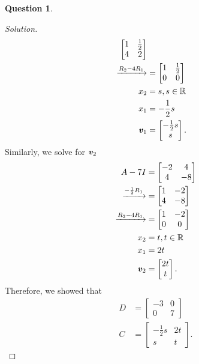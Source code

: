 \documentclass{article}
\newcommand{\R}{\mathbb{R}}
\theoremstyle{definition}
\newtheorem{question}{Question}
\newcommand{\vt}[1]{\textbf{\textit{#1}}}
\newcommand{\0}{\textbf{0}}
\begin{document}
\begin{question}
\begin{proof}[Solution]
\begin{align*}
        \begin{bmatrix}
            1 & \frac{1}{2} \\
            4 & 2
        \end{bmatrix} \\
        \xrightarrow{R_2-4R_1} &=
        \begin{bmatrix}
            1 & \frac{1}{2} \\
            0 & 0
        \end{bmatrix} \\
        x_2 &= s, s\in\R \\
        x_1 &= -\frac{1}{2}s \\
        \vt{v}_1 &=
        \begin{bmatrix}
            -\frac{1}{2}s \\ s
        \end{bmatrix}.
    \end{align*}
    Similarly, we solve for \(\vt{v}_2\)
    \begin{align*}
        A-7I &=
        \begin{bmatrix}
            -2 & 4 \\
            4 & -8
        \end{bmatrix} \\
        \xrightarrow{-\frac{1}{2}R_1} &=
        \begin{bmatrix}
            1 & -2 \\
            4 & -8
        \end{bmatrix} \\
        \xrightarrow{R_2-4R_1} &=
        \begin{bmatrix}
            1 & -2 \\
            0 & 0
        \end{bmatrix} \\
        x_2 &= t, t\in\R \\
        x_1 &= 2t \\
        \vt{v}_2 &=
        \begin{bmatrix}
            2t \\ t
        \end{bmatrix}.
    \end{align*}
    Therefore, we showed that
    \begin{align*}
        D &=
        \begin{bmatrix}
            -3 & 0 \\
            0 & 7
        \end{bmatrix} \\
        C &=
        \begin{bmatrix}
            -\frac{1}{2}s & 2t \\
            s & t
        \end{bmatrix}.
    \end{align*}
\end{proof}

\end{question}
\end{document}
